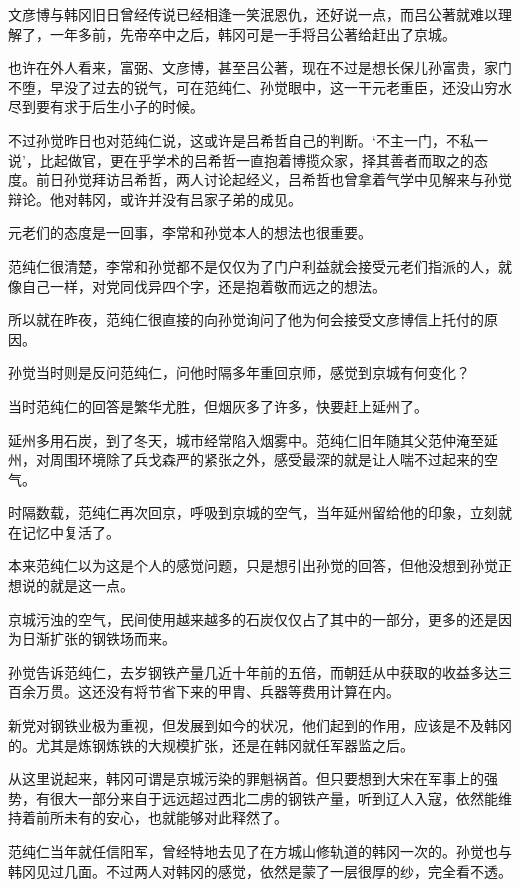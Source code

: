文彦博与韩冈旧日曾经传说已经相逢一笑泯恩仇，还好说一点，而吕公著就难以理解了，一年多前，先帝卒中之后，韩冈可是一手将吕公著给赶出了京城。

也许在外人看来，富弼、文彦博，甚至吕公著，现在不过是想长保儿孙富贵，家门不堕，早没了过去的锐气，可在范纯仁、孙觉眼中，这一干元老重臣，还没山穷水尽到要有求于后生小子的时候。

不过孙觉昨日也对范纯仁说，这或许是吕希哲自己的判断。‘不主一门，不私一说’，比起做官，更在乎学术的吕希哲一直抱着博揽众家，择其善者而取之的态度。前日孙觉拜访吕希哲，两人讨论起经义，吕希哲也曾拿着气学中见解来与孙觉辩论。他对韩冈，或许并没有吕家子弟的成见。

元老们的态度是一回事，李常和孙觉本人的想法也很重要。

范纯仁很清楚，李常和孙觉都不是仅仅为了门户利益就会接受元老们指派的人，就像自己一样，对党同伐异四个字，还是抱着敬而远之的想法。

所以就在昨夜，范纯仁很直接的向孙觉询问了他为何会接受文彦博信上托付的原因。

孙觉当时则是反问范纯仁，问他时隔多年重回京师，感觉到京城有何变化？

当时范纯仁的回答是繁华尤胜，但烟灰多了许多，快要赶上延州了。

延州多用石炭，到了冬天，城市经常陷入烟雾中。范纯仁旧年随其父范仲淹至延州，对周围环境除了兵戈森严的紧张之外，感受最深的就是让人喘不过起来的空气。

时隔数载，范纯仁再次回京，呼吸到京城的空气，当年延州留给他的印象，立刻就在记忆中复活了。

本来范纯仁以为这是个人的感觉问题，只是想引出孙觉的回答，但他没想到孙觉正想说的就是这一点。

京城污浊的空气，民间使用越来越多的石炭仅仅占了其中的一部分，更多的还是因为日渐扩张的钢铁场而来。

孙觉告诉范纯仁，去岁钢铁产量几近十年前的五倍，而朝廷从中获取的收益多达三百余万贯。这还没有将节省下来的甲胄、兵器等费用计算在内。

新党对钢铁业极为重视，但发展到如今的状况，他们起到的作用，应该是不及韩冈的。尤其是炼钢炼铁的大规模扩张，还是在韩冈就任军器监之后。

从这里说起来，韩冈可谓是京城污染的罪魁祸首。但只要想到大宋在军事上的强势，有很大一部分来自于远远超过西北二虏的钢铁产量，听到辽人入寇，依然能维持着前所未有的安心，也就能够对此释然了。

范纯仁当年就任信阳军，曾经特地去见了在方城山修轨道的韩冈一次的。孙觉也与韩冈见过几面。不过两人对韩冈的感觉，依然是蒙了一层很厚的纱，完全看不透。

